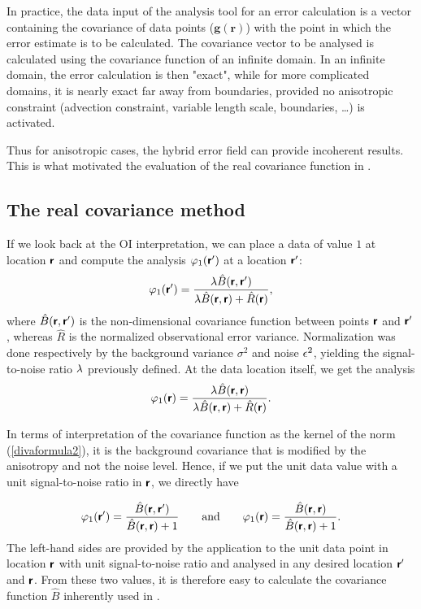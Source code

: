 In practice, the data input of the analysis tool for an error calculation is a vector containing the
covariance of data points ($\mathbf{g}(\mathbf{r})$) with the point in which the error estimate is to be calculated. The covariance vector to be analysed is calculated using the covariance function of an infinite domain. In an infinite domain, the error calculation is then "exact", while for more complicated domains, it is nearly exact far away from boundaries, provided no anisotropic constraint (advection constraint, variable length scale, boundaries, \ldots) is activated. 

Thus for anisotropic cases, the hybrid error field can provide incoherent results. This is what motivated the evaluation of the real covariance function in \diva.


\subsection{The real covariance method}

If we look back at the OI interpretation, we can place a data of value $1$ at location $\mbox{\boldmath $ \protect\mathsf{r} $}$ and compute the analysis $\varphi_1(\mbox{\boldmath $ \protect\mathsf{r} $}^\prime)$ at a location $\mbox{\boldmath $ \protect\mathsf{r} $}^\prime$:
\begin{equation}
\varphi_1(\mbox{\boldmath $ \protect\mathsf{r} $}^\prime) = {\lambda \hat{B} (\mbox{\boldmath $ \protect\mathsf{r} $},\mbox{\boldmath $ \protect\mathsf{r} $}^\prime)\over  \lambda \hat{B}(\mbox{\boldmath $ \protect\mathsf{r} $},\mbox{\boldmath $ \protect\mathsf{r} $}) + \hat{R}(\mbox{\boldmath $ \protect\mathsf{r} $}) },
\end{equation}
where $\hat{B}(\mbox{\boldmath $ \protect\mathsf{r} $},\mbox{\boldmath $ \protect\mathsf{r} $}^\prime)$ is the non-dimensional covariance function between points $\mbox{\boldmath $ \protect\mathsf{r} $}$ and $\mbox{\boldmath $ \protect\mathsf{r} $}^\prime$, whereas $\hat{R}$ is the normalized observational error variance. Normalization was done respectively by the background variance $\sigma^2$ and noise $\epsilon^2$, yielding the signal-to-noise ratio $\lambda$ previously defined. 
At the data location itself, we get the analysis
\begin{equation}
\varphi_1(\mbox{\boldmath $ \protect\mathsf{r} $}) = {\lambda \hat{B} (\mbox{\boldmath $ \protect\mathsf{r} $},\mbox{\boldmath $ \protect\mathsf{r} $}) \over \lambda \hat{B}(\mbox{\boldmath $ \protect\mathsf{r} $},\mbox{\boldmath $ \protect\mathsf{r} $}) + \hat{R}(\mbox{\boldmath $ \protect\mathsf{r} $}) }.
\end{equation}

In terms of interpretation of the covariance function as the kernel of the norm (\eqref{divaformula2}), it is the background covariance that is modified by the anisotropy and not the noise level. Hence, if we put the unit data value with a unit signal-to-noise ratio in $\mbox{\boldmath $ \protect\mathsf{r} $}$, we directly have

\begin{equation}
\varphi_1(\mbox{\boldmath $ \protect\mathsf{r} $}^\prime) = { \hat{B} (\mbox{\boldmath $ \protect\mathsf{r} $},\mbox{\boldmath $ \protect\mathsf{r} $}^\prime)\over   \hat{B}(\mbox{\boldmath $ \protect\mathsf{r} $},\mbox{\boldmath $ \protect\mathsf{r} $}) + 1 } \qquad \textrm{and} \qquad 
\varphi_1(\mbox{\boldmath $ \protect\mathsf{r} $}) = { \hat{B} (\mbox{\boldmath $ \protect\mathsf{r} $},\mbox{\boldmath $ \protect\mathsf{r} $}) \over  \hat{B}(\mbox{\boldmath $ \protect\mathsf{r} $},\mbox{\boldmath $ \protect\mathsf{r} $}) + 1 }.
\end{equation}
The left-hand sides are provided by the \diva application to the unit data point in location $\mbox{\boldmath $ \protect\mathsf{r} $}$ with unit signal-to-noise ratio and analysed in any desired location $\mbox{\boldmath $ \protect\mathsf{r} $}^\prime$ and $\mbox{\boldmath $ \protect\mathsf{r} $}$. From these two values, it is therefore easy to calculate the covariance function $\hat{B}$ inherently used in \diva.

